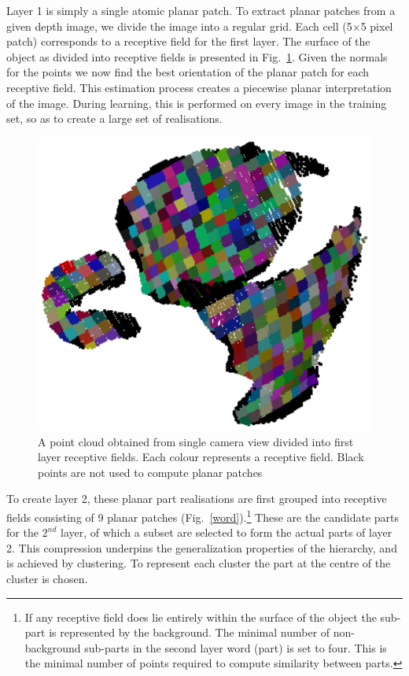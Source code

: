 \documentclass[letterpaper,10pt,conference]{ieeeconf}  %
\begin{document}
Layer 1 is simply a single atomic planar patch. To extract planar patches from a given depth image, we divide the image into a regular grid. Each cell (5$\times$5 pixel patch) corresponds to a receptive field for the first layer. The surface of the object as divided into receptive fields is presented in Fig.~\ref{recFields1}. Given the normals for the points we now find the best orientation of the planar patch for each receptive field.  This estimation process creates a piecewise planar interpretation of the image. During learning, this is performed on every image in the training set, so as to create a large set of realisations.

\begin{figure}[t]
 \centering
\includegraphics[width=0.5\columnwidth]{../images/recFields1.eps}
\caption{A point cloud obtained from single camera view divided into first layer receptive fields. Each colour represents a receptive field. Black points are not used to compute planar patches}
 \label{recFields1}
\end{figure}

To create layer 2, these planar part realisations are first grouped into receptive fields consisting of 9 planar patches (Fig.~\ref{word}).\footnote{If any receptive field does lie entirely within the surface of the object the sub-part is represented by the background. The minimal number of non-background sub-parts in the second layer word (part) is set to four. This is the minimal number of points required to compute similarity between parts.} These are the candidate parts for the $2^{nd}$ layer, of which a subset are selected to form the actual parts of layer 2. This compression underpins the generalization properties of the hierarchy, and is achieved by clustering. To represent each cluster the part at the centre of the cluster is chosen.
\end{document}
